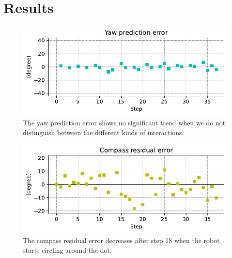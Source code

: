 \documentclass[runningheads]{llncs}
\begin{document}


\section{Results}

\begin{figure}
	\includegraphics[width=\textwidth]{02_yaw_pe.pdf}
	\caption{The yaw prediction error shows no significant trend when we do not distinguish between the different kinds of interactions.} \label{fig:yaw_pe}
\end{figure}

\begin{figure}
	\includegraphics[width=\textwidth]{04_Compass.pdf}
	\caption{The compass residual error decreases after step 18 when the robot starts circling around the dot.} \label{fig:compass}
\end{figure}
\end{document}
